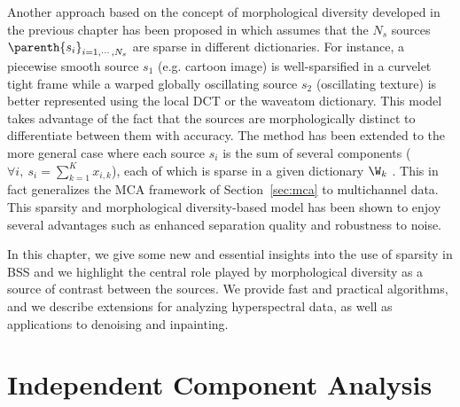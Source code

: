 Another approach based on the concept of morphological diversity developed in the previous chapter has been proposed in \citet{starck:bobin06} which assumes that the $N_s$ sources $\parenth{s_i}_{i=1,\cdots,N_s}$ are sparse in different dictionaries. For instance, a piecewise smooth source $s_1$ (e.g. cartoon image) is well-sparsified in a curvelet tight frame while a warped globally oscillating source $s_2$ (oscillating texture) is better represented using the local DCT or the waveatom dictionary. This model takes advantage of the fact that the sources are morphologically distinct to differentiate between them with accuracy. The method has been extended to the more general case where each source $s_i$ is the sum of several components ($\forall i, ~ s_i = \sum_{k=1}^K x_{i,k}$), each of which is sparse in a given dictionary $\W_k$ \citep{starck:bobin07}. This in fact generalizes the MCA framework of Section~\ref{sec:mca} to multichannel data. This sparsity and morphological diversity-based model has been shown to enjoy several advantages such as enhanced separation quality and robustness to noise.

In this chapter, we give some new and essential insights into the use of sparsity in BSS and we highlight the central role played by morphological diversity as a source of contrast between the sources. We provide fast and practical algorithms, and we describe extensions for analyzing hyperspectral data, as well as applications to denoising and inpainting.

 



\section{Independent Component Analysis}
\label{sec:ICA}

